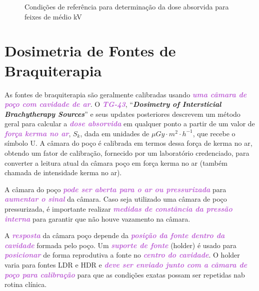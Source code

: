 \documentclass[11pt,a4paper]{article}
\begin{document}
	\begin{figure}[h]
		\centering
		\caption{Condições de referência para determinação da dose absorvida para feixes de médio kV}
		\label{fig:condicoesReferenciaDoseMediokv}
	\end{figure}

\section{Dosimetria de Fontes de Braquiterapia}

	As fontes de braquiterapia são geralmente calibradas usando \textcolor{MediumOrchid}{\textbf{\textit{uma câmara de poço com cavidade de ar}}}. O \textcolor{MediumOrchid}{\textbf{\textit{TG-43}}}, ``\textbf{\textit{Dosimetry of Intersticial Brachytherapy Sources}}'' e seus updates posteriores descrevem um método geral para calcular a \textcolor{MediumOrchid}{\textbf{\textit{dose absorvida}}} em qualquer ponto a partir de um valor de \textcolor{MediumOrchid}{\textbf{\textit{força kerma no ar}}}, $S_k$, dada em  unidades de $\mu Gy \cdot m^2 \cdot h^{-1}$, que recebe o símbolo U. A câmara do poço é calibrada em termos dessa força de kerma no ar, obtendo um fator de calibração, fornecido por um laboratório credenciado, para converter a leitura atual da câmara poço em força kerma no ar (também chamada de intensidade kerma no ar).

	A câmara do poço \textcolor{MediumOrchid}{\textbf{\textit{pode ser aberta para o ar ou pressurizada}}} para \textcolor{MediumOrchid}{\textbf{\textit{aumentar o sinal}}} da câmara. Caso seja utilizado uma câmara de poço pressurizada, é importante realizar \textcolor{MediumOrchid}{\textbf{\textit{medidas de constância da pressão interna}}} para garantir que não houve vazamento na câmara. 
	
	A \textcolor{MediumOrchid}{\textbf{\textit{resposta}}} da câmara poço depende da \textcolor{MediumOrchid}{\textbf{\textit{posição da fonte dentro da cavidade}}} formada pelo poço. Um \textcolor{MediumOrchid}{\textbf{\textit{suporte de fonte}}} (holder) é usado para \textcolor{MediumOrchid}{\textbf{\textit{posicionar}}} de forma reprodutiva a fonte no \textcolor{MediumOrchid}{\textbf{\textit{centro do cavidade}}}. O holder varia para fontes LDR e HDR e \textcolor{MediumOrchid}{\textbf{\textit{deve ser enviado junto com a câmara de poço para calibração}}} para que as condições exatas possam ser repetidas nab rotina clínica.
\end{document}
